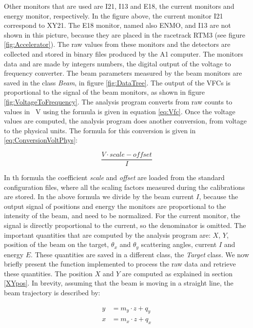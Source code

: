 \begin{appendices}
Other monitors that are used are I21, I13 and E18, the current monitors and energy monitor, respectively. In the figure above, the current monitor I21 correspond to XY21. The E18 monitor, named also ENMO, and I13 are not shown in this picture, because they are placed in the racetrack RTM3 (see figure \ref{fig:Accelerator}). 
The raw values from these monitors and the detectors are collected and stored in binary files produced by the A1 computer. The monitors data and are made by integers numbers, the digital output of the voltage to frequency converter. 
The beam parameters measured by the beam monitors are saved in the class \textit{Beam}, in figure \ref{fig:DataTree}.
The output of the VFCs is proportional to the signal of the beam monitors, as shown in figure \ref{fig:VoltageToFrequency}. The analysis program converts from raw counts to values in \SI{}{\volt} using the formula is given in equation \ref{eq:Vfc}. Once the voltage values are computed, the analysis program does another conversion, from voltage to the physical units. The formula for this conversion is given in \ref{eq:ConversionVoltPhys}:

\begin{equation} \label{eq:ConversionVoltPhys}
\dfrac{V \cdot scale - offset}{I}
\end{equation}

In th formula the coefficient \textit{scale} and \textit{offset} are loaded from the standard configuration files, where all the scaling factors measured during the calibrations are stored.
In the above formula we divide by the beam current $I$, because the output signal of positions and energy the monitors are proportional to the intensity of the beam, and need to be normalized. For the current monitor, the signal is directly proportional to the current, so the denominator is omitted.
The important quantities that are computed by the analysis program are: $X$, $Y$, position of the beam on the target, $\theta_{x}$ and $\theta_{y}$ scattering angles, current $I$ and energy $E$. These quantities are saved in a different class, the \textit{Target} class.
We now briefly present the function implemented to process the raw data and retrieve these quantities.
The position $X$ and $Y$ are computed as explained in section \ref{XYpos}. In brevity, assuming that the beam is moving in a straight line, the  beam trajectory is described by:

\begin{align*}
y &= m_{y} \cdot z + q_{y} \\
x &= m_{x} \cdot z + q_{x}
\end{align*}


\end{appendices}
